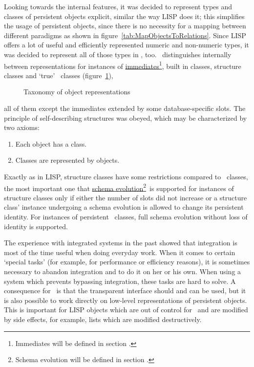Looking towards the internal features, it
was decided to represent types and classes of persistent objects
explicit, similar the way LISP does it; this simplifies the usage of
persistent objects, since there is no necessity for a mapping between
different paradigms as shown in
figure~\ref{tab:MapObjectsToRelations}. Since LISP offers a lot of
useful and efficiently represented numeric and non-numeric types,
it was decided to represent
all of those types in \plobwoexcl, too. \plob\ distinguishes
internally between representations for instances of
\hyperlink{link:Immediate}{immediates}\footnote{Immediates will be
  defined in section .}, built in
classes, structure classes and `true' \clos\ classes
(figure~\ref{fig:ObjectTaxonomie}),
\begin{figure}[htbp]
\centerline{}
\caption{Taxonomy of object representations}%
\label{fig:ObjectTaxonomie}
\end{figure}%
all of them except the immediates extended by some database-specific
slots. The principle of self-describing structures was obeyed, which
may be characterized by two axioms:
\begin{enumerate}
\item Each object has a class.
\item Classes are represented by objects.
\end{enumerate}
Exactly as in LISP, structure classes have some restrictions compared
to \clos\ classes, the most important one that
\hyperlink{link:SchemaEvolution}{schema evolution}\footnote{Schema
  evolution will be defined in section
  .}\ is supported for
instances of structure classes only if either the number of slots did
not increase or a structure class' instance undergoing a schema
evolution is allowed to change its persistent identity. For instances
of persistent \clos\ classes, full schema evolution without loss of
identity is supported.

The experience with integrated systems in the past showed that
integration is most of the time useful when doing everyday work. When
it comes to certain `special tasks' (for example, for performance or
efficiency reasons), it is sometimes necessary to abandon integration and to do
it on her or his own. When using a system which prevents bypassing
integration, these tasks are hard to solve. A consequence for \plob\ 
is that the transparent interface should and can be used, but it is
also possible to work directly on low-level representations of
persistent objects. This is important for LISP objects which are out
of control for \plob\ and are modified by side effects, for example,
lists which are modified destructively.

